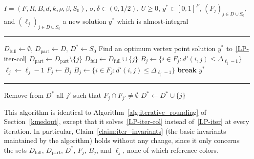 \begin{algorithm}[h]
\caption{Iterative Rounding Algorithm (colorful)} \label{alg:iterative_rounding_col}
\begin{algorithmic}
    \Require $I = (F, R, B, d, k, \rho, \beta, S_0)$, $\sigma, \delta \in (0, 1/2)$, $U \ge 0$, $y^* \in [0,1]^F$, $(F_j)_{j \in D \cup S_0}$, and $(\ell_j)_{j \in D \cup S_0}$
    \Ensure a new solution $y^*$ which is almost-integral
\end{algorithmic}
\noindent\rule{\linewidth}{0.4pt}

\begin{algorithmic}[1]
    \State $D_\text{full} \gets \emptyset$, $D_\text{part} \gets D$, $D^* \gets S_0$
        \State Find an optimum vertex point solution $y^*$ to~\eqref{LP-iter-col}
            \State $D_\text{part} \gets D_\text{part} \setminus \{j\}$
            \State $D_\text{full} \gets D_\text{full} \cup \{j\}$
            \State $B_j \gets \{i \in F_j : d'(i,j) \le \Delta_{\ell_j-1}\}$
            \State {}
            \State $\ell_j \gets \ell_j - 1$
            \State $F_j \gets B_j$
            \State $B_j \gets \{i \in F_j : d'(i,j) \le \Delta_{\ell_j-1}\}$
            \State {}
        \Else
            \State \textbf{break}
        \EndIf
    \EndWhile
    \State \Return $y^*$
\end{algorithmic}
\noindent\rule{\linewidth}{0.4pt}

\begin{algorithmic}[1]
            \State Remove from $D^*$ all $j'$ such that $F_j \cap F_{j'} \neq \emptyset$
            \State $D^* \gets D^* \cup \{j\}$
        \EndIf
    \EndFunction
\end{algorithmic}
\end{algorithm}

This algorithm is identical to {Algorithm~\ref{alg:iterative_rounding}} of Section~\ref{kmedout}, except that it solves~\eqref{LP-iter-col} instead of~\eqref{LP-iter} at every iteration. In particular, Claim~\ref{claim:iter_invariants} (the basic invariants maintained by the algorithm) holds without any change, since it only concerns the sets $D_\text{full}$, $D_\text{part}$, $D^*$, $F_j$, $B_j$, and $\ell_j$, none of which reference colors.

